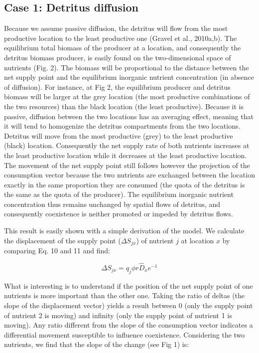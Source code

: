 \documentclass[12pt]{paper}
\begin{document}
\subsection{Case 1: Detritus diffusion}

Because we assume passive diffusion, the detritus will flow from the most productive location to the least productive one (Gravel et al., 2010a,b). The equilibrium total biomass of the producer at a location, and consequently the detritus biomass producer, is easily found on the two-dimensional space of nutrients (Fig. 2). The biomass will be proportional to the distance between the net supply point and the equilibrium inorganic nutrient concentration (in absence of diffusion). For instance, at Fig 2, the equilibrium producer and detritus biomass will be larger at the grey location (the most productive combinations of the two resources) than the black location (the least productive). Because it is passive, diffusion between the two locations has an averaging effect, meaning that it will tend to homogenize the detritus compartments from the two locations. Detritus will move from the most productive (grey) to the least productive (black) location. Consequently the net supply rate of both nutrients increases at the least productive location  while it decreases at the least productive location. The movement of the net supply point still follows however the projection of the consumption vector because the two nutrients are exchanged between the location exactly in the same proportion they are consumed (the quota of the detritus is the same as the quota of the producer). The equilibrium inorganic nutrient concentration thus remains unchanged by spatial flows of detritus, and consequently coexistence is neither promoted or impeded by detritus flows.

	This result is easily shown with a simple derivation of the model. We calculate the displacement of the supply point ($\Delta S_{jx}$) of nutrient $j$ at location $x$ by comparing Eq. 10 and 11 and find:

\begin{equation}
	\label{e:bnet}
	\Delta S_{jx}=q_{j}\phi r\widehat{D}_{x}e^{-1}
\end{equation}

What is interesting is to understand if the position of the net supply point of one nutrients is more important than the other one. Taking the ratio of deltas (the slope of the displacement vector) yields a result between 0 (only the supply point of nutrient 2 is moving) and infinity (only the supply point of nutrient 1 is moving). Any ratio different from the slope of the consumption vector indicates a differential movement susceptible to influence coexistence. Considering the two nutrients, we find that the slope of the change (see Fig 1) is:
\end{document}
